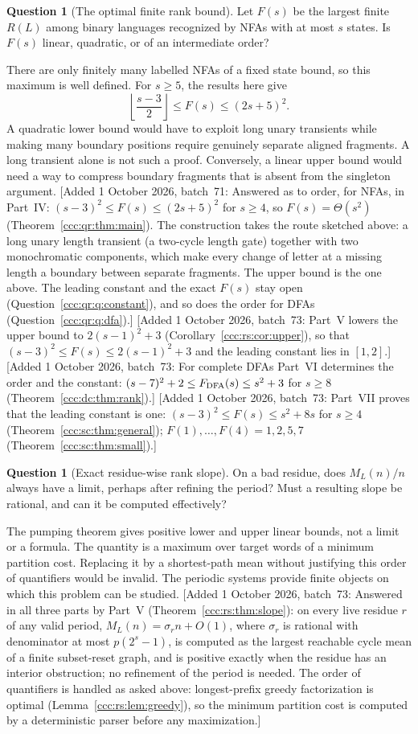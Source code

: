\documentclass[11pt,letterpaper]{article}
\theoremstyle{definition}
\newtheorem{question}[theorem]{Question}
\theoremstyle{remark}
\newcommand{\waddsevone}[1]{\textup{[}Added 1 October 2026, batch~71: #1\textup{]}}
\newcommand{\waddsevthree}[1]{\textup{[}Added 1 October 2026, batch~73: #1\textup{]}}
\begin{document}
\begin{question}[The optimal finite rank bound]\label{ccc:ps:q:rank}
Let $F(s)$ be the largest finite $R(L)$ among binary languages recognized
by NFAs with at most $s$ states. Is $F(s)$ linear, quadratic, or of an
intermediate order?
\end{question}
There are only finitely many labelled NFAs of a fixed state bound, so
this maximum is well defined. For $s\ge5$, the results here give
\[
 \left\lfloor\frac{s-3}{2}\right\rfloor
 \le F(s)\le(2s+5)^2.
\]
A quadratic lower bound would have to exploit long unary transients while
making many boundary positions require genuinely separate aligned
fragments. A long transient alone is not such a proof. Conversely, a
linear upper bound would need a way to compress boundary fragments that
is absent from the singleton argument.
\waddsevone{Answered as to order, for NFAs, in Part~IV:
$(s-3)^2\le F(s)\le(2s+5)^2$ for $s\ge4$, so $F(s)=\Theta(s^2)$
(Theorem~\ref{ccc:qr:thm:main}). The construction takes the route sketched
above: a long unary length transient (a two-cycle length gate) together
with two monochromatic components, which make every change of letter at a
missing length a boundary between separate fragments. The upper bound is the
one above. The leading constant and the exact $F(s)$ stay open
(Question~\ref{ccc:qr:q:constant}), and so does the order for DFAs
(Question~\ref{ccc:qr:q:dfa}).}
\waddsevthree{Part~V lowers the upper bound to $2(s-1)^2+3$
(Corollary~\ref{ccc:rs:cor:upper}), so that $(s-3)^2\le F(s)\le2(s-1)^2+3$
and the leading constant lies in $[1,2]$.}
\waddsevthree{For complete DFAs Part~VI determines the order and the
constant: $(s-7)^2+2\le F_{\rm DFA}(s)\le s^2+3$ for $s\ge8$
(Theorem~\ref{ccc:dc:thm:rank}).}
\waddsevthree{Part~VII proves that the leading constant is one: $(s-3)^2\le F(s)\le s^2+8s$ for $s\ge4$ (Theorem~\ref{ccc:sc:thm:general}); $F(1),\ldots,F(4)=1,2,5,7$
(Theorem~\ref{ccc:sc:thm:small}).}

\begin{question}[Exact residue-wise rank slope]\label{ccc:ps:q:slope}
On a bad residue, does $M_L(n)/n$ always have a limit, perhaps after
refining the period? Must a resulting slope be rational, and can it be
computed effectively?
\end{question}
The pumping theorem gives positive lower and upper linear bounds, not
a limit or a formula. The quantity is a maximum over target words of a
minimum partition cost. Replacing it by a shortest-path mean without
justifying this order of quantifiers would be invalid. The periodic
systems provide finite objects on which this problem can be studied.
\waddsevthree{Answered in all three parts by Part~V
(Theorem~\ref{ccc:rs:thm:slope}): on every live residue $r$ of any valid
period, $M_L(n)=\sigma_rn+O(1)$, where $\sigma_r$ is rational with denominator
at most $p(2^s-1)$, is computed as the largest reachable cycle mean of a
finite subset-reset graph, and is positive exactly when the residue has an
interior obstruction; no refinement of the period is needed. The order of
quantifiers is handled as asked above: longest-prefix greedy factorization is
optimal (Lemma~\ref{ccc:rs:lem:greedy}), so the minimum partition cost is
computed by a deterministic parser before any maximization.}
\end{document}

